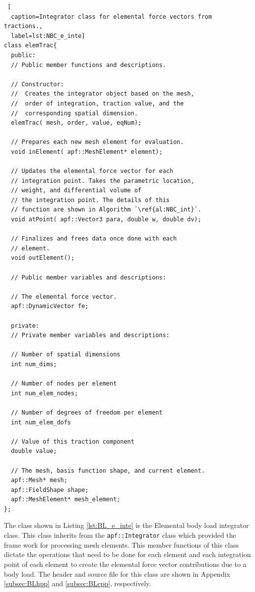 \documentclass[a4paper, 12pt]{article}
\begin{document}
\begin{lstlisting} [
  caption=Integrator class for elemental force vectors from tractions.,
  label=lst:NBC_e_inte]
class elemTrac{
  public:
  // Public member functions and descriptions.

  // Constructor:
  //  Creates the integrator object based on the mesh,
  //  order of integration, traction value, and the
  //  corresponding spatial dimension.
  elemTrac( mesh, order, value, eqNum);

  // Prepares each new mesh element for evaluation.
  void inElement( apf::MeshElement* element);

  // Updates the elemental force vector for each
  // integration point. Takes the parametric location,
  // weight, and differential volume of
  // the integration point. The details of this
  // function are shown in Algorithm `\ref{al:NBC_int}`.
  void atPoint( apf::Vector3 para, double w, double dv);

  // Finalizes and frees data once done with each
  // element.
  void outElement();

  // Public member variables and descriptions:

  // The elemental force vector.
  apf::DynamicVector fe;

  private:
  // Private member variables and descriptions:

  // Number of spatial dimensions
  int num_dims;

  // Number of nodes per element
  int num_elem_nodes;

  // Number of degrees of freedom per element
  int num_elem_dofs

  // Value of this traction component
  double value;

  // The mesh, basis function shape, and current element.
  apf::Mesh* mesh;
  apf::FieldShape shape;
  apf::MeshElement* mesh_element;
};
\end{lstlisting}
\vspace{\baselineskip}

The class shown in Listing
\ref{lst:BL_e_inte} is the
Elemental body load integrator
class.
This class inherits from the \texttt{apf::Integrator} class
which provided the frame work for processing mesh elements.
This member functions of this class dictate the operations that
need to be done for each element and each integration point
of each element to create the elemental force vector contributions
due to a body load.
The header and source file for this class are shown in Appendix
\ref{subsec:BLhpp} and
\ref{subsec:BLcpp},
respectively.
\end{document}
